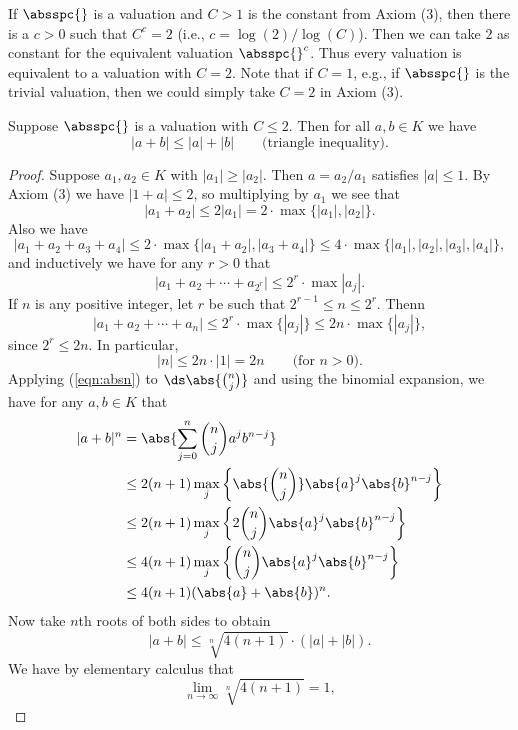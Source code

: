 \documentclass[11pt]{book}
\begin{document}
\begin{ch}
If $\absspc{}$ is a valuation and $C>1$ is the constant from Axiom
(3), then there is a $c>0$ such that $C^c=2$ (i.e.,
$c=\log(2)/\log(C)$).  Then we can take $2$ as constant for the
equivalent valuation $\absspc{}^c$.  Thus every valuation is
equivalent to a valuation with $C=2$. Note that if $C=1$, e.g.,
if $\absspc{}$ is the trivial valuation, then we could
simply take $C=2$ in Axiom (3).
\begin{proposition}
Suppose $\absspc{}$ is a valuation with $C\leq 2$.
Then for all $a, b\in K$ we have
\begin{equation}\label{val3p}
  |a + b| \leq |a| + |b|\qquad \text{(triangle inequality)}.
\end{equation}
\end{proposition}
\begin{proof}
Suppose $a_1, a_2\in K$ with $|a_1|\geq|a_2|$.  Then $a=a_2/a_1$
satisfies $|a|\leq 1$.  By Axiom (3) we have $|1+a|\leq 2$, so
multiplying by $a_1$ we see that
$$|a_1+ a_2|\leq 2|a_1| = 2\cdot\max\{|a_1|,|a_2|\}.$$
Also we have
$$|a_1+ a_2 + a_3 + a_4|\leq 2\cdot\max\{|a_1+a_2|,|a_3+a_4|\}
   \leq 4\cdot \max\{|a_1|,|a_2|,|a_3|,|a_4|\},
$$
and inductively we have for any $r>0$ that
$$|a_1 + a_2 + \cdots  + a_{2^r}| \leq 2^r\cdot\max{|a_j|}.$$
If $n$ is any positive integer, let $r$ be such
that $2^{r-1}\leq n\leq 2^r$. Thenn
$$|a_1 + a_2 + \cdots + a_{n}| \leq 2^r\cdot \max\{|a_j|\}
 \leq 2n\cdot \max\{|a_j|\},$$
since $2^r\leq 2n$.  In particular,
\begin{equation}\label{eqn:absn}
  |n| \leq 2n\cdot |1| = 2n \qquad\text{(for $n>0$)}.
\end{equation}
Applying (\ref{eqn:absn}) to $\ds\abs{\binom{n}{j}}$ and using
the binomial expansion, we have for any $a,b\in K$ that
\begin{align*}
|a+b|^n &= \abs{\sum_{j=0}^n \binom{n}{j} a^j b^{n-j}}\\
   &\leq  2(n+1)\max_j\left\{ \abs{\binom{n}{j}} \abs{a}^j\abs{b}^{n-j}\right\}\\
   &\leq  2(n+1)\max_j\left\{ 2 \binom{n}{j} \abs{a}^j\abs{b}^{n-j}\right\}\\
   &\leq  4(n+1)\max_j\left\{ \binom{n}{j} \abs{a}^j\abs{b}^{n-j}\right\}\\
   &\leq  4(n+1)(\abs{a}+\abs{b})^n.
\end{align*}
Now take $n$th roots of both sides to obtain
$$
|a+b| \leq \sqrt[n]{4(n+1)}\cdot (|a| + |b|).
$$
We have by elementary calculus that
$$
  \lim_{n\to \infty} \sqrt[n]{4(n+1)} = 1,
$$
\end{proof}
\end{ch}
\end{document}
